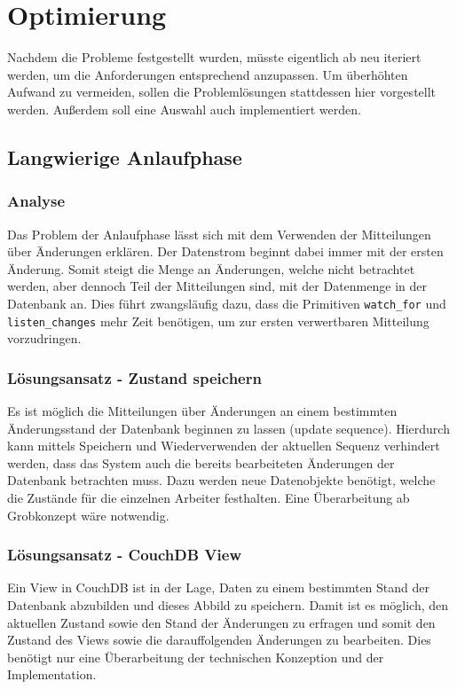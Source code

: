 \chapter{Optimierung}
\label{cha:opt}
Nachdem die Probleme festgestellt wurden,
müsste eigentlich ab  neu iteriert werden,
um die Anforderungen entsprechend anzupassen.
Um überhöhten Aufwand zu vermeiden,
sollen die Problemlösungen stattdessen hier vorgestellt werden.
Außerdem soll eine Auswahl auch implementiert werden.

\section{Langwierige Anlaufphase}
\label{cha:opt:anlaufphase}
\subsection{Analyse}

Das Problem der Anlaufphase lässt sich mit dem Verwenden der Mitteilungen über Änderungen erklären. Der Datenstrom beginnt dabei immer mit der ersten Änderung.
Somit steigt die Menge an Änderungen, welche nicht betrachtet werden, aber dennoch Teil der Mitteilungen sind, mit der Datenmenge in der Datenbank an.
Dies führt zwangsläufig dazu, dass die Primitiven \verb|watch_for| und \verb|listen_changes| mehr Zeit benötigen, um zur ersten verwertbaren Mitteilung vorzudringen.


\subsection{Lösungsansatz - Zustand speichern}

Es ist möglich die Mitteilungen über Änderungen an einem bestimmten Änderungsstand der Datenbank beginnen zu lassen (update sequence).
Hierdurch kann mittels Speichern und Wiederverwenden der aktuellen Sequenz verhindert werden,
dass das System auch die bereits bearbeiteten Änderungen der Datenbank betrachten muss.
Dazu werden neue Datenobjekte benötigt, welche die Zustände für die einzelnen Arbeiter festhalten. Eine Überarbeitung ab Grobkonzept wäre notwendig.


\subsection{Lösungsansatz - CouchDB View}

Ein View in CouchDB ist in der Lage, Daten zu einem bestimmten Stand der Datenbank abzubilden und dieses Abbild zu speichern.
Damit ist es möglich, den aktuellen Zustand sowie den Stand der Änderungen zu erfragen und somit den Zustand des Views sowie die darauffolgenden Änderungen zu bearbeiten.
Dies benötigt nur eine Überarbeitung der technischen Konzeption und der Implementation.

